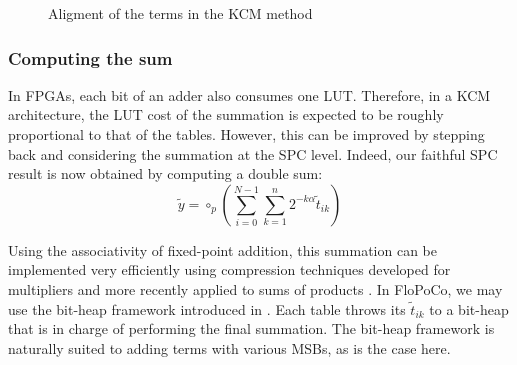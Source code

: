 \documentclass[twocolumn]{IEEEtran}
\begin{document}
\begin{figure}
  \begin{boxedminipage}{\columnwidth}
  \centering
\end{boxedminipage}
  \caption{Aligment of the terms in the KCM method}
  \label{fig:KCMmaggraph}
\end{figure}



\subsubsection{Computing the sum}
In FPGAs, each bit of an adder also consumes one LUT.
Therefore, in a KCM architecture, the LUT cost of the summation is expected to be roughly proportional to that of the tables. 
However, this can be improved by stepping back and considering the summation at the SPC level.
Indeed, our faithful SPC result is now obtained by computing a double sum:
\begin{equation}
  \label{eq:SPCwithKCM}
  \widetilde{y}=\circ_p\left( \sum_{i=0}^{N-1}\sum_{k=1}^n 2^{-k\alpha} \widetilde{t}_{ik} \right)
\end{equation}
 
Using the associativity of fixed-point addition, this summation can be implemented very efficiently using compression techniques developed for multipliers \cite{ErcegovacLang2003} and more recently applied to sums of products \cite{parendeh2011:TRETS,2012-ICCD-Kumar-SOP}.
In FloPoCo, we may use the bit-heap framework introduced in  \cite{DinIstSer2013-FPL-BitHeap}.
Each table throws its $\widetilde{t}_{ik}$ to a bit-heap that is in charge of performing the final summation.
The bit-heap framework is naturally suited to adding terms with various MSBs, as is the case here.
\end{document}
